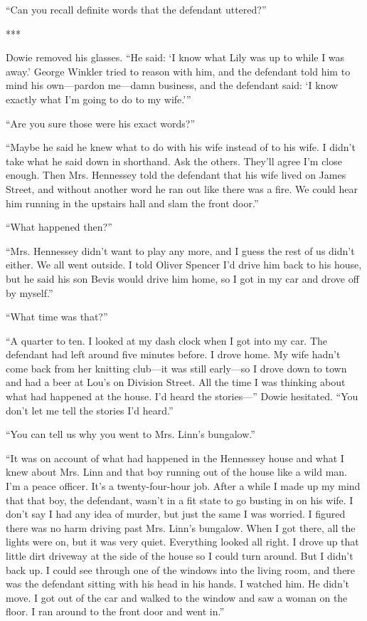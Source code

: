 \documentclass{novel}
\begin{document}
“Can you recall definite words that the defendant uttered?”

***

Dowie removed his glasses. “He said: ‘I know what Lily was up to while I was away.’ George Winkler tried to reason with him, and the defendant told him to mind his own—pardon me—damn business, and the defendant said: ‘I know exactly what I’m going to do to my wife.’”

“Are you sure those were his exact words?”

“Maybe he said he knew what to do with his wife instead of to his wife. I didn’t take what he said down in shorthand. Ask the others. They’ll agree I’m close enough. Then Mrs. Hennessey told the defendant that his wife lived on James Street, and without another word he ran out like there was a fire. We could hear him running in the upstairs hall and slam the front door.”

“What happened then?”

“Mrs. Hennessey didn’t want to play any more, and I guess the rest of us didn’t either. We all went outside. I told Oliver Spencer I’d drive him back to his house, but he said his son Bevis would drive him home, so I got in my car and drove off by myself.”

“What time was that?”

“A quarter to ten. I looked at my dash clock when I got into my car. The defendant had left around five minutes before. I drove home. My wife hadn’t come back from her knitting club—it was still early—so I drove down to town and had a beer at Lou’s on Division Street. All the time I was thinking about what had happened at the house. I’d heard the stories—” Dowie hesitated. “You don’t let me tell the stories I’d heard.”

“You can tell us why you went to Mrs. Linn’s bungalow.”

“It was on account of what had happened in the Hennessey house and what I knew about Mrs. Linn and that boy running out of the house like a wild man. I’m a peace officer. It’s a twenty-four-hour job. After a while I made up my mind that that boy, the defendant, wasn’t in a fit state to go busting in on his wife. I don’t say I had any idea of murder, but just the same I was worried. I figured there was no harm driving past Mrs. Linn’s bungalow. When I got there, all the lights were on, but it was very quiet. Everything looked all right. I drove up that little dirt driveway at the side of the house so I could turn around. But I didn’t back up. I could see through one of the windows into the living room, and there was the defendant sitting with his head in his hands. I watched him. He didn’t move. I got out of the car and walked to the window and saw a woman on the floor. I ran around to the front door and went in.”
\end{document}
